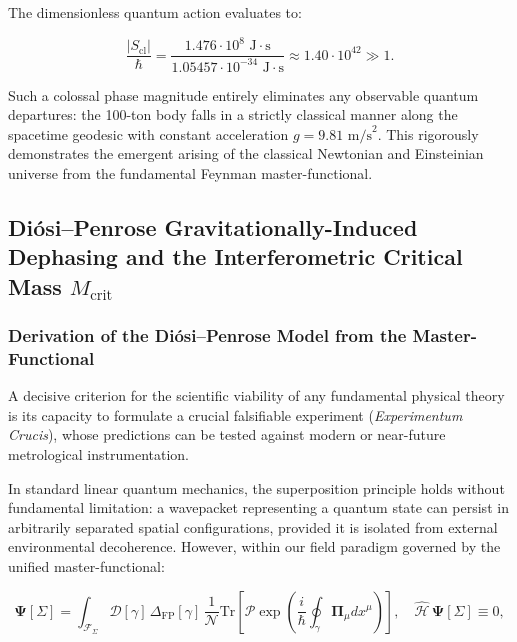 \documentclass[11pt,a4paper]{article}
\theoremstyle{definition}
\begin{document}
The dimensionless quantum action evaluates to:

\begin{equation}\label{eq:5.30}\tag{5.30}
\frac{|S_{\text{cl}}|}{\hbar} = \frac{1.476 \cdot 10^8\text{ J}\cdot\text{s}}{1.05457 \cdot 10^{-34}\text{ J}\cdot\text{s}} \approx 1.40 \cdot 10^{42} \gg 1.
\end{equation}

Such a colossal phase magnitude entirely eliminates any observable quantum departures: the 100-ton body falls in a strictly classical manner along the spacetime geodesic with constant acceleration $g = 9.81\text{ m/s}^2$. This rigorously demonstrates the emergent arising of the classical Newtonian and Einsteinian universe from the fundamental Feynman master-functional.

\subsection{Diósi--Penrose Gravitationally-Induced Dephasing and the Interferometric Critical Mass $M_{\text{crit}}$}\label{sec:5.2}

\subsubsection{Derivation of the Diósi--Penrose Model from the Master-Functional}\label{sec:5.2.1}

A decisive criterion for the scientific viability of any fundamental physical theory is its capacity to formulate a crucial falsifiable experiment (\textit{Experimentum Crucis}), whose predictions can be tested against modern or near-future metrological instrumentation.

In standard linear quantum mechanics, the superposition principle holds without fundamental limitation: a wavepacket representing a quantum state can persist in arbitrarily separated spatial configurations, provided it is isolated from external environmental decoherence. However, within our field paradigm governed by the unified master-functional:

\begin{equation}\label{eq:5.31}\tag{5.31}
\mathbf{\Psi}[\Sigma] = \int_{\mathcal{F}_\Sigma} \mathcal{D}[\gamma] \, \Delta_{\text{FP}}[\gamma] \, \frac{1}{\mathcal{N}} \text{Tr}\left[ \mathcal{P}\exp\left( \frac{i}{\hbar} \oint_\gamma \mathbf{\Pi}_\mu dx^\mu \right) \right], \quad \hat{\mathcal{H}}\,\mathbf{\Psi}[\Sigma] \equiv 0,
\end{equation}
\end{document}
